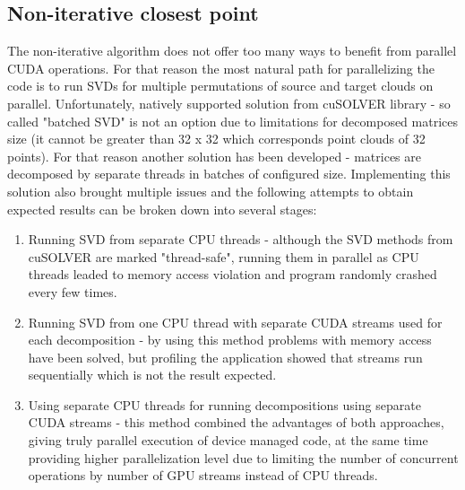 \documentclass[titlepage]{article}
\begin{document}
\subsection{Non-iterative closest point}
The non-iterative algorithm does not offer too many ways to benefit from parallel CUDA operations. For that reason the most natural path for parallelizing the code is to run SVDs for multiple permutations of source and target clouds on parallel. Unfortunately, natively supported solution from cuSOLVER library - so called "batched SVD" is not an option due to limitations for decomposed matrices size (it cannot be greater than 32 x 32 which corresponds point clouds of 32 points). For that reason another solution has been developed - matrices are decomposed by separate threads in batches of configured size. Implementing this solution also brought multiple issues and the following attempts to obtain expected results can be broken down into several stages:
\begin{enumerate}
\item Running SVD from separate CPU threads - although the SVD methods from cuSOLVER are marked "thread-safe", running them in parallel as CPU threads leaded to memory access violation and program randomly crashed every few times.
\item Running SVD from one CPU thread with separate CUDA streams used for each decomposition - by using this method problems with memory access have been solved, but profiling the application showed that streams run sequentially which is not the result expected.
\item Using separate CPU threads for running decompositions using separate CUDA streams - this method combined the advantages of both approaches, giving truly parallel execution of device managed code, at the same time providing higher parallelization level due to limiting the number of concurrent operations by number of GPU streams instead of CPU threads.
\end{enumerate}
\end{document}
